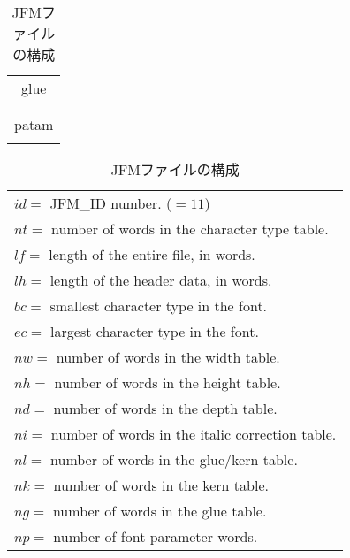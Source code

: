﻿\documentclass[twoside]{jarticle}
\begin{document}
\begin{table}[h]
\begin{minipage}[b]{2in}
\begin{tabular}{|c|c|}
\multicolumn{2}{|c|}{glue} \\
\multicolumn{2}{|c|}{}\\ \hline
\multicolumn{2}{|c|}{}\\
\multicolumn{2}{|c|}{patam} \\
\multicolumn{2}{|c|}{}\\ \hline
\end{tabular}
\end{minipage}
\begin{minipage}[b]{3.3in}
\noindent
\begin{tabular}{l}
$id=$ JFM\_ID number. ($=11$) \\
$nt=$ number of words in the character type table. \\
$lf=$ length of the entire file, in words. \\
$lh=$ length of the header data, in words. \\
$bc=$ smallest character type in the font. \\
$ec=$ largest character type in the font. \\
$nw=$ number of words in the width table. \\
$nh=$ number of words in the height table. \\
$nd=$ number of words in the depth table. \\
$ni=$ number of words in the italic correction table. \\
$nl=$ number of words in the glue/kern table. \\
$nk=$ number of words in the kern table. \\
$ng=$ number of words in the glue table. \\
$np=$ number of font parameter words. \\
\end{tabular}
\end{minipage}
\caption{JFMファイルの構成\label{構成}}
\end{table}
\end{document}
